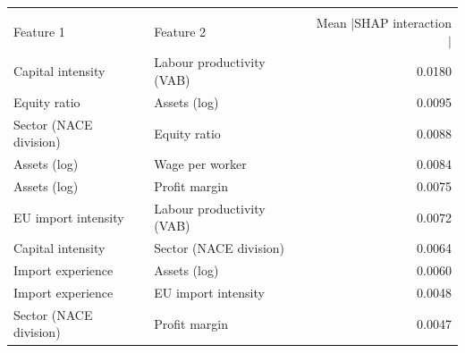 \begin{table}[!ht]
 \label{tab:shap_interactions}
\centering
\begin{tabular}{llr}
\hline
 & & \\
Feature 1 & Feature 2 & Mean $|$SHAP interaction$|$ \\
\hline
Capital intensity & Labour productivity (VAB) & 0.0180 \\
Equity ratio & Assets (log) & 0.0095 \\
Sector (NACE division) & Equity ratio & 0.0088 \\
Assets (log) & Wage per worker & 0.0084 \\
Assets (log) & Profit margin & 0.0075 \\
EU import intensity & Labour productivity (VAB) & 0.0072 \\
Capital intensity & Sector (NACE division) & 0.0064 \\
Import experience & Assets (log) & 0.0060 \\
Import experience & EU import intensity & 0.0048 \\
Sector (NACE division) & Profit margin & 0.0047 \\
\hline
\end{tabular}
\end{table}
